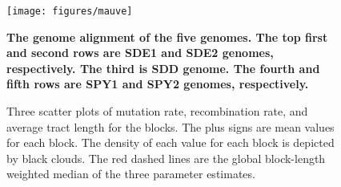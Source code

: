 \documentclass[10pt]{article}
\newcommand{\lyxdot}{.}
\begin{document}

\clearpage{}

\begin{figure}
\begin{center}
\texttt{[image: figures/mauve]}
\end{center}
\caption{\label{fig:mauve}
\bf{The genome alignment of the five genomes.} The top
first and second rows are SDE1 and SDE2 genomes, respectively. The third is SDD
genome. The fourth and fifth rows are SPY1 and SPY2 genomes, respectively.}
\end{figure}
\clearpage{}


\begin{figure}
\begin{center}


\end{center}
\caption{\label{fig:scatter3}Three scatter plots of mutation rate, recombination
rate, and average tract length for the blocks. The plus signs are mean values
for each block. The density of each value for each block is depicted by black
clouds.  The red dashed lines are the global block-length weighted median of the
three parameter estimates.}
\end{figure}
\clearpage{}%
\end{document}
